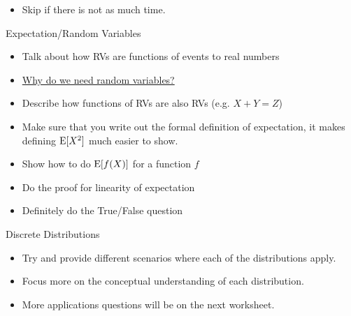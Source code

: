 \documentclass{exam}
\begin{document}
\begin{questions}
\begin{itemize}
\begin{itemize}
\item Skip if there is not as much time.
\end{itemize}
\end{itemize}
\item Expectation/Random Variables
\begin{itemize}
\item Talk about how RVs are functions of events to real numbers
\item \href{http://mathoverflow.net/questions/250500/why-do-we-need-random-variables}{Why do we need random variables?}
\item Describe how functions of RVs are also RVs (e.g. $X + Y = Z$)
\item Make sure that you write out the formal definition of expectation, it makes defining $\text{E}[X^2]$ much easier to show.
\item Show how to do $\text{E}[f(X)]$ for a function $f$
\item Do the proof for linearity of expectation
\item Definitely do the True/False question
\end{itemize}
\item Discrete Distributions
\begin{itemize}
\item Try and provide different scenarios where each of the distributions apply.
\item Focus more on the conceptual understanding of each distribution.
\item More applications questions will be on the next worksheet.
\end{itemize}
\end{questions}
\end{document}
